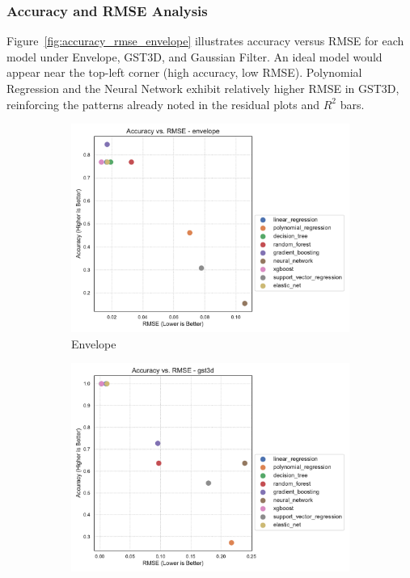 \subsubsection{Accuracy and RMSE Analysis}
\label{subsec:accuracy-and-rmse-analysis}


Figure~\ref{fig:accuracy_rmse_envelope} illustrates accuracy versus \ac{RMSE} for each model under Envelope, \ac{GST3D}, and Gaussian Filter.
An ideal model would appear near the top-left corner (high accuracy, low \ac{RMSE}).
Polynomial Regression and the Neural Network exhibit relatively higher \ac{RMSE} in \ac{GST3D}, reinforcing the patterns already noted in the residual plots and $R^2$ bars.

\begin{figure}[htbp]
    \centering
    \begin{subfigure}[t]{0.32\textwidth}
        \includegraphics[width=\textwidth]{assets/images/05/accuracy_by_rmse_per_model_envelope}
        \caption{Envelope}
    \end{subfigure}
    \hfill
    \begin{subfigure}[t]{0.32\textwidth}
        \includegraphics[width=\textwidth]{assets/images/05/accuracy_by_rmse_per_model_gst3d}

\end{subfigure}
\end{figure}
